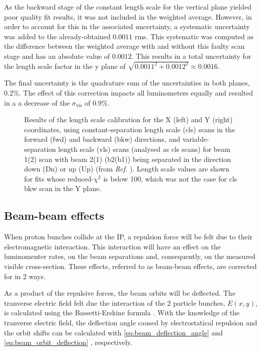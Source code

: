 As the backward stage of the constant length scale for the vertical plane yielded poor quality fit results, it was not included in the weighted average. However, in order to account for this in the associated uncertainty, a systematic uncertainty was added to the already-obtained $0.0011$ rms. This systematic was computed as the difference between the weighted average with and without this faulty scan stage and has an absolute value of $0.0012$. This results in a total uncertainty for the length scale factor in the y plane of $\sqrt{0.0011^2 + 0.0012^2} \approx 0.0016$.

The final uncertainty is the quadrature sum of the uncertainties in both planes, 0.2\%. The effect of this correction impacts all luminometers equally and resulted in a a decrease of the $\sigma_{\mathrm{vis}}$ of $0.9\%$.

\begin{figure}[h!]
	\centering
	\caption[Length scale calibration results]{Results of the length scale calibration for the X (left) and Y (right) coordinates, using constant-separation length scale (cls) scans in the forward (fwd) and backward (bkw) directions, and variable-separation length scale (vls) scans (analysed as cls scans) for beam 1(2) scan with beam 2(1) (b2(b1)) being separated in the direction down (Dn) or up (Up) (from \textit{Ref.} \cite{CMS-DP-2024-068}). Length scale values are shown for fits whose reduced-$\chi^2$ is below 100, which was not the case for cls bkw scan in the Y plane.}
	\label{fig:length_scale_fit_summary}
\end{figure}

\subsection{Beam-beam effects}

When proton bunches collide at the IP, a repulsion force will be felt due to their electromagnetic interaction. This interaction will have an effect on the luminomenter rates, on the beam separations and, consequently, on the measured visible cross-section. These effects, referred to as beam-beam effects, are corrected for in 2 ways.

As a product of the repulsive forces, the beam orbits will be deflected. The tranverse electric field felt due the interaction of the 2 particle bunches, $E(x, y)$, is calculated using the Bassetti-Erskine formula \cite{Bassetti:122227}. With the knowledge of the tranverse electric field, the deflection angle caused by electrostatical repulsion and the orbit shifts can be calculated with \autoref{eq:beam_deflection_angle} and \autoref{eq:beam_orbit_deflection} \cite{PhysRevLett.62.2949}, respectively.

